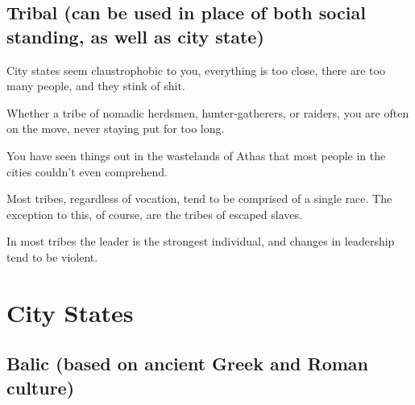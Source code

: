 \subsection{Tribal (can be used in place of both social standing, as well as city state)}

\begin{description}
    \item City states seem claustrophobic to you, everything is too close, there are too many people, and they stink of shit.
    \item Whether a tribe of nomadic herdsmen, hunter-gatherers, or raiders, you are often on the move, never staying put for too long.
    \item You have seen things out in the wastelands of Athas that most people in the cities couldn’t even comprehend.
    \item Most tribes, regardless of vocation, tend to be comprised of a single race. The exception to this, of course, are the tribes of escaped slaves.
    \item In most tribes the leader is the strongest individual, and changes in leadership tend to be violent.
\end{description}

\section{City States}
\subsection{Balic (based on ancient Greek and Roman culture)}


